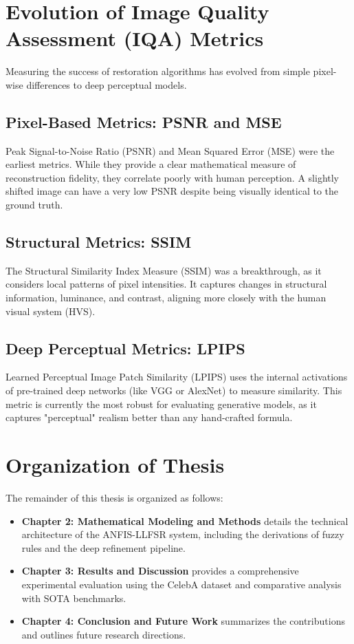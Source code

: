 \section{Evolution of Image Quality Assessment (IQA) Metrics}
Measuring the success of restoration algorithms has evolved from simple pixel-wise differences to deep perceptual models.

\subsection{Pixel-Based Metrics: PSNR and MSE}
Peak Signal-to-Noise Ratio (PSNR) and Mean Squared Error (MSE) were the earliest metrics. While they provide a clear mathematical measure of reconstruction fidelity, they correlate poorly with human perception. A slightly shifted image can have a very low PSNR despite being visually identical to the ground truth.

\subsection{Structural Metrics: SSIM}
The Structural Similarity Index Measure (SSIM) was a breakthrough, as it considers local patterns of pixel intensities. It captures changes in structural information, luminance, and contrast, aligning more closely with the human visual system (HVS).

\subsection{Deep Perceptual Metrics: LPIPS}
Learned Perceptual Image Patch Similarity (LPIPS) uses the internal activations of pre-trained deep networks (like VGG or AlexNet) to measure similarity. This metric is currently the most robust for evaluating generative models, as it captures "perceptual" realism better than any hand-crafted formula.

\section{Organization of Thesis}
The remainder of this thesis is organized as follows:
\begin{itemize}
    \item \textbf{Chapter 2: Mathematical Modeling and Methods} details the technical architecture of the ANFIS-LLFSR system, including the derivations of fuzzy rules and the deep refinement pipeline.
    \item \textbf{Chapter 3: Results and Discussion} provides a comprehensive experimental evaluation using the CelebA dataset and comparative analysis with SOTA benchmarks.
    \item \textbf{Chapter 4: Conclusion and Future Work} summarizes the contributions and outlines future research directions.
\end{itemize}
